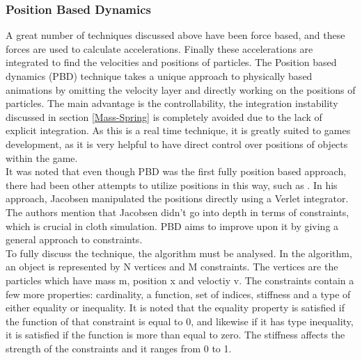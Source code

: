 \documentclass[12pt,a4paper]{article}
\begin{document}
\subsubsection{Position Based Dynamics}
A great number of techniques discussed above have been force based, and these forces are used to calculate accelerations. Finally these accelerations are integrated to find the velocities and positions of particles. The Position based dynamics (PBD) technique takes a unique approach to physically based animations by omitting the velocity layer and directly working on the positions of particles. \cite{muller2007position} The main advantage is the controllability, the integration instability discussed in section \ref{Mass-Spring} is completely avoided due to the lack of explicit integration. As this is a real time technique, it is greatly suited to games development, as it is very helpful to have direct control over positions of objects within the game.\\

It was noted that even though PBD was the first fully position based approach, there had been other attempts to utilize positions in this way, such as \cite{fisixArticle}. In his approach, Jacobsen manipulated the positions directly using a Verlet integrator. The authors mention that Jacobsen didn't go into depth in terms of constraints, which is crucial in cloth simulation. PBD aims to improve upon it by giving a general approach to constraints.\\

To fully discuss the technique, the algorithm must be analysed. In the algorithm, an object is represented by N vertices and M constraints. The vertices are the particles which have mass m, position x and veloctiy v. The constraints contain a few more properties: cardinality, a function, set of indices, stiffness and a type of either equality or inequality. It is noted that the equality property is satisfied if the function of that constraint is equal to 0, and likewise if it has type inequality, it is satisfied if the function is more than equal to zero. The stiffness affects the strength of the constraints and it ranges from 0 to 1.
\end{document}

